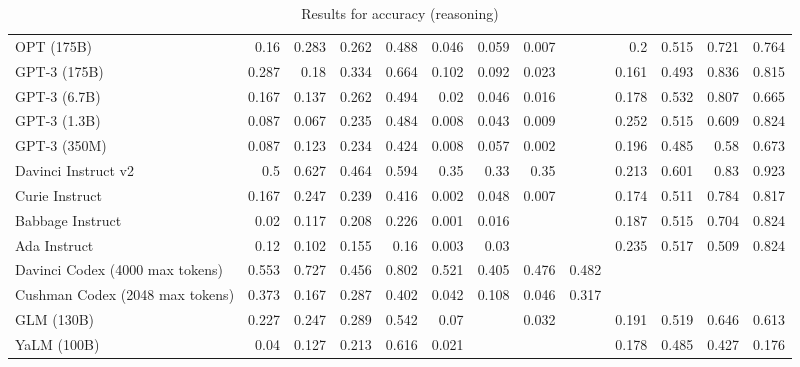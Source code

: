\begin{table}[htp]
{\begin{tabular}{lrrrrrrrrrrrr}
OPT (175B) & 0.16 & 0.283 & 0.262 & 0.488 & 0.046 & 0.059 & 0.007 &  & 0.2 & 0.515 & 0.721 & 0.764 \\
GPT-3 (175B) & 0.287 & 0.18 & 0.334 & 0.664 & 0.102 & 0.092 & 0.023 &  & 0.161 & 0.493 & 0.836 & 0.815 \\
GPT-3 (6.7B) & 0.167 & 0.137 & 0.262 & 0.494 & 0.02 & 0.046 & 0.016 &  & 0.178 & 0.532 & 0.807 & 0.665 \\
GPT-3 (1.3B) & 0.087 & 0.067 & 0.235 & 0.484 & 0.008 & 0.043 & 0.009 &  & 0.252 & 0.515 & 0.609 & 0.824 \\
GPT-3 (350M) & 0.087 & 0.123 & 0.234 & 0.424 & 0.008 & 0.057 & 0.002 &  & 0.196 & 0.485 & 0.58 & 0.673 \\
Davinci Instruct v2 & 0.5 & 0.627 & 0.464 & 0.594 & 0.35 & 0.33 & 0.35 &  & 0.213 & 0.601 & 0.83 & 0.923 \\
Curie Instruct & 0.167 & 0.247 & 0.239 & 0.416 & 0.002 & 0.048 & 0.007 &  & 0.174 & 0.511 & 0.784 & 0.817 \\
Babbage Instruct & 0.02 & 0.117 & 0.208 & 0.226 & 0.001 & 0.016 &  &  & 0.187 & 0.515 & 0.704 & 0.824 \\
Ada Instruct & 0.12 & 0.102 & 0.155 & 0.16 & 0.003 & 0.03 &  &  & 0.235 & 0.517 & 0.509 & 0.824 \\
Davinci Codex (4000 max tokens) & 0.553 & 0.727 & 0.456 & 0.802 & 0.521 & 0.405 & 0.476 & 0.482 &  &  &  &  \\
Cushman Codex (2048 max tokens) & 0.373 & 0.167 & 0.287 & 0.402 & 0.042 & 0.108 & 0.046 & 0.317 &  &  &  &  \\
GLM (130B) & 0.227 & 0.247 & 0.289 & 0.542 & 0.07 &  & 0.032 &  & 0.191 & 0.519 & 0.646 & 0.613 \\
YaLM (100B) & 0.04 & 0.127 & 0.213 & 0.616 & 0.021 &  &  &  & 0.178 & 0.485 & 0.427 & 0.176 \\
\bottomrule
\end{tabular}}
\caption{Results for accuracy (reasoning)}
\label{fig:accuracy (reasoning)}
\end{table}